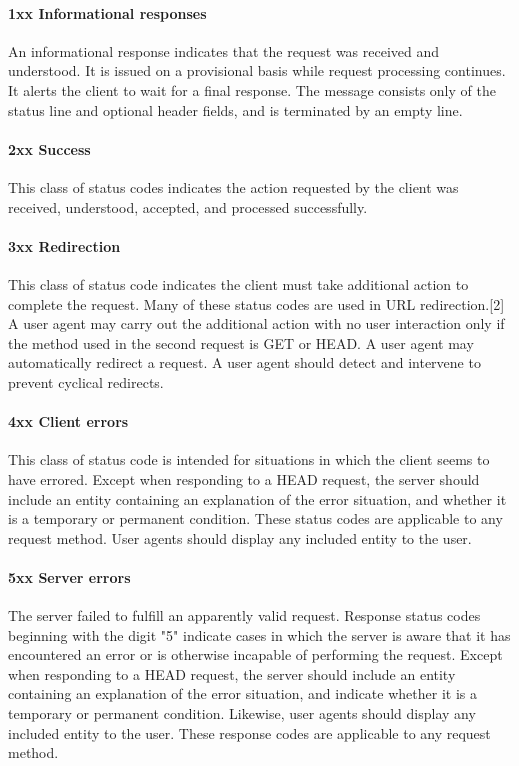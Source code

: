 \paragraph{1xx Informational responses}
An informational response indicates that the request was received and understood. It is issued on a provisional basis while request processing continues. It alerts the client to wait for a final response. The message consists only of the status line and optional header fields, and is terminated by an empty line.

\paragraph{2xx Success}
This class of status codes indicates the action requested by the client was received, understood, accepted, and processed successfully.

\paragraph{3xx Redirection}
This class of status code indicates the client must take additional action to complete the request. Many of these status codes are used in URL redirection.[2]
A user agent may carry out the additional action with no user interaction only if the method used in the second request is GET or HEAD. A user agent may automatically redirect a request. A user agent should detect and intervene to prevent cyclical redirects.

\paragraph{4xx Client errors}
This class of status code is intended for situations in which the client seems to have errored. Except when responding to a HEAD request, the server should include an entity containing an explanation of the error situation, and whether it is a temporary or permanent condition. These status codes are applicable to any request method. User agents should display any included entity to the user.

\paragraph{5xx Server errors}
The server failed to fulfill an apparently valid request. Response status codes beginning with the digit "5" indicate cases in which the server is aware that it has encountered an error or is otherwise incapable of performing the request. Except when responding to a HEAD request, the server should include an entity containing an explanation of the error situation, and indicate whether it is a temporary or permanent condition. Likewise, user agents should display any included entity to the user. These response codes are applicable to any request method.




